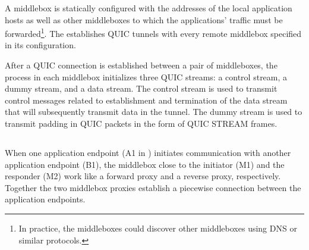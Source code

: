 A {\sys} middlebox is statically configured with the addresses of the local
application hosts as well as other middleboxes to which the applications’
traffic must be forwarded\footnote{In practice, the middleboxes could discover
other middleboxes using DNS or similar protocols.}.
The {\dshaper} establishes QUIC tunnels with every remote middlebox specified in
its configuration.

After a QUIC connection is established between a pair of middleboxes, the
{\dshaper} process in each middlebox initializes three QUIC streams: a control
stream, a dummy stream, and a data stream.
The control stream is used to transmit control messages related to establishment
and termination of the data stream that will subsequently transmit data in the
tunnel. The dummy stream is used to transmit padding in QUIC packets in the
form of QUIC STREAM frames.


\subsection{}
When one application endpoint (\eg A1 in ) initiates
communication with another application endpoint (B1), the middlebox close to the
initiator (M1) and the responder (M2) work like a forward proxy and a reverse
proxy, respectively.
Together the two middlebox proxies establish a piecewise connection between the
application endpoints.

